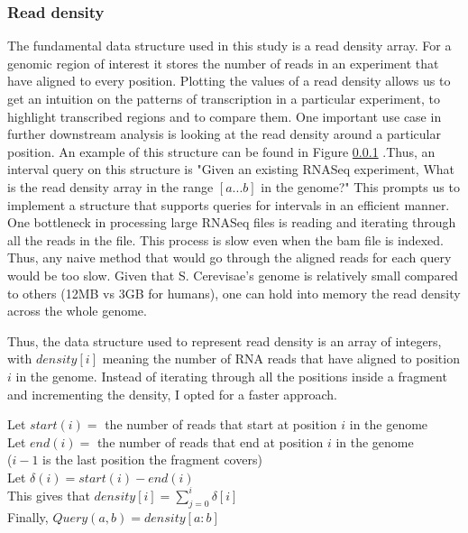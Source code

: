 \documentclass[12pt]{article}
\begin{document}
\subsubsection{Read density}\label{density}
The fundamental data structure used in this study is a read density array. For a genomic region of interest it stores the number of reads in an experiment that have aligned to every position. Plotting the values of a read density allows us to get an intuition on the patterns of transcription in a particular experiment, to highlight transcribed regions and to compare them. One important use case in further downstream analysis is looking at the read density around a particular position. An example of this structure can be found in Figure \ref{density} .Thus, an interval query on this structure is "Given an existing RNASeq experiment, What is the read density array in the range $[a...b]$ in the genome?" 
This prompts us to implement a structure that supports queries for intervals in an efficient manner. One bottleneck in processing large RNASeq files is reading and iterating through all the reads in the file. This process is slow even when the bam file is indexed. Thus, any naive method that would go through the aligned reads for each query would be too slow. Given that S. Cerevisae's genome is relatively small compared to others (12MB vs 3GB for humans), one can hold into memory the read density across the whole genome.

Thus, the data structure used to represent read density is an array of integers, with $density[i]$ meaning the number of RNA reads that have aligned to position $i$ in the genome. Instead of iterating through all the positions inside a fragment and incrementing the density, I opted for a faster approach. 



\begin{center}
Let $start(i) =$ the number of reads that start at position $i$ in the genome \\
Let $end(i) =$ the number of reads that end at position $i$ in the genome \\
($i-1$ is the last position the fragment covers) \\
Let $\delta(i) = start(i) - end(i)$ \\
This gives that $density[i] = \sum\limits_{j=0}^i \delta[i]$ \\
Finally, $Query(a, b) = density[a:b]$

\end{center}
\end{document}
